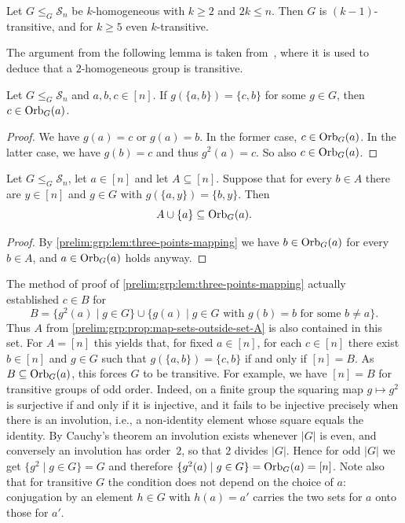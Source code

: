 \begin{theorem}
	\label{prelim:thm:livingstone}
	Let $G \le_G \mathcal S_n$ be $k$-homogeneous with $k \ge 2$ and $2k \le n$.
	Then $G$ is $(k-1)$-transitive, and for $k \ge 5$ even $k$-transitive.
\end{theorem}

The argument from the following lemma 
is taken from~\cite[p.~533]{mcalister1998semigroups}, where it is used to deduce
that a $2$-homogeneous group is transitive.

\begin{lemma} \label{prelim:grp:lem:three-points-mapping}
	Let $G \le_G \mathcal S_n$ and $a,b,c \in [n]$.
	If $g(\{a,b\}) = \{c,b\}$ for some $g \in G$,
	then $c \in \Orbit{a}{G}$.	
\end{lemma}
\begin{proof}
    We have $g(a) = c$ or $g(a) = b$.
    In the former case, $c \in \Orbit{a}{G}$.
    In the latter case, we have  $g(b) = c$ and thus $g^2(a) = c$.
    So also $c \in \Orbit{a}{G}$. 
\end{proof}

\begin{proposition} \label{prelim:grp:prop:map-sets-outside-set-A}
	Let $G \le_G \mathcal S_n$, let $a \in [n]$ and let $A \subseteq [n]$.
	Suppose that for every $b \in A$ there are $y \in [n]$ and $g \in G$ with
	$g(\{a,y\}) = \{b,y\}$.
	Then
	\[
	A \cup \{a\} \subseteq \Orbit{a}{G}.
	\]
\end{proposition}
\begin{proof}
	By \cref{prelim:grp:lem:three-points-mapping}
	we have $b \in \Orbit{a}{G}$ for every $b \in A$,
	and $a \in \Orbit{a}{G}$ holds anyway.
\end{proof}

\begin{remark}
	The method of proof of \cref{prelim:grp:lem:three-points-mapping}
	actually established $c \in B$ for
	\[
	B = \{g^2(a) \mid g \in G\} \cup
	\{g(a) \mid g \in G \text{ with } g(b) = b \text{ for some } b \ne a \}.
	\]
	Thus $A$ from \cref{prelim:grp:prop:map-sets-outside-set-A} is also contained
	in this set.
	For $A = [n]$ this yields that, for fixed $a \in [n]$, for each $c \in [n]$ there exist
	$b \in [n]$ and $g \in G$ such that $g(\{a,b\}) = \{c,b\}$ if and only if $[n] = B$.
	As $B \subseteq \Orbit{a}{G}$, this forces $G$ to be transitive.
	For example, we have $[n] = B$ for transitive groups of odd order.
	Indeed, on a finite group the squaring map $g \mapsto g^2$ is surjective if and only if
	it is injective, and it fails to be injective precisely when there is an involution, i.e.,
	a non-identity element whose square equals the identity.
	By Cauchy's theorem an involution exists whenever $|G|$ is even, and conversely an
	involution has order~$2$, so that $2$ divides $|G|$.
	Hence for odd $|G|$ we get $\{g^2 \mid g \in G\} = G$ and therefore
	$\{g^2(a) \mid g \in G\} = \Orbit{a}{G} = [n]$.
	Note also that for transitive $G$ the condition does not depend on the choice of $a$:
	conjugation by an element $h \in G$ with $h(a) = a'$ carries the two sets
	for $a$ onto those for $a'$.
\end{remark}


